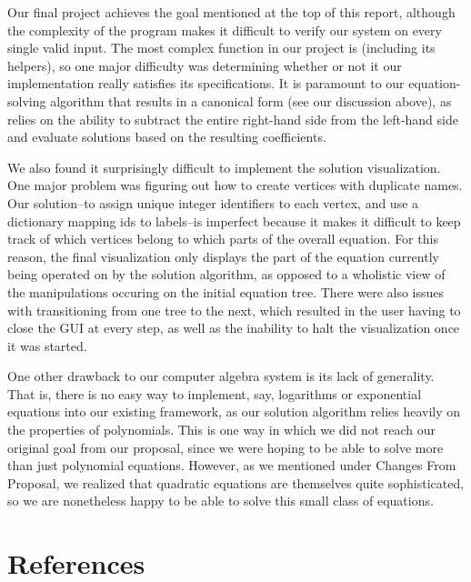 \documentclass[11pt]{article}
\begin{document}
Our final project achieves the goal mentioned at the top of this report, although the complexity of the program makes it difficult to verify our system on every single valid input. The most complex function in our project is  (including its helpers), so one major difficulty was determining whether or not it our implementation really satisfies its specifications. It is paramount to our equation-solving algorithm that  results in a canonical form (see our discussion above), as  relies on the ability to subtract the entire right-hand side from the left-hand side and evaluate solutions based on the resulting coefficients. 

We also found it surprisingly difficult to implement the solution visualization. One major problem was figuring out how to create vertices with duplicate names. Our solution--to assign unique integer identifiers to each vertex, and use a dictionary mapping ids to labels--is imperfect because it makes it difficult to keep track of which vertices belong to which parts of the overall equation. For this reason, the final visualization only displays the part of the equation currently being operated on by the solution algorithm, as opposed to a wholistic view of the manipulations occuring on the initial equation tree. There were also issues with transitioning from one tree to the next, which resulted in the user having to close the GUI at every step, as well as the inability to halt the visualization once it was started.

One other drawback to our computer algebra system is its lack of generality. That is, there is no easy way to implement, say, logarithms or exponential equations into our existing framework, as our solution algorithm relies heavily on the properties of polynomials. This is one way in which we did not reach our original goal from our proposal, since we were hoping to be able to solve more than just polynomial equations. However, as we mentioned under Changes From Proposal, we realized that quadratic equations are themselves quite sophisticated, so we are nonetheless happy to be able to solve this small class of equations.

\section*{References}
\end{document}
